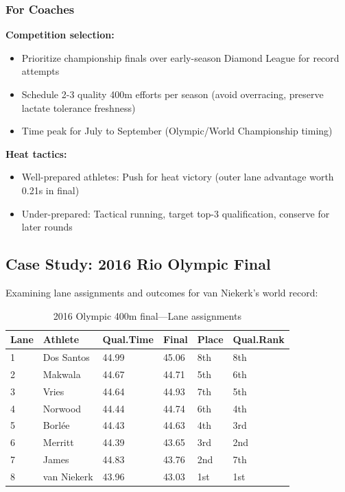 \subsubsection{For Coaches}

\textbf{Competition selection:}
\begin{itemize}
    \item Prioritize championship finals over early-season Diamond League for record attempts
    \item Schedule 2-3 quality 400m efforts per season (avoid overracing, preserve lactate tolerance freshness)
    \item Time peak for July to September (Olympic/World Championship timing)
\end{itemize}

\textbf{Heat tactics:}
\begin{itemize}
    \item Well-prepared athletes: Push for heat victory (outer lane advantage worth 0.21s in final)
    \item Under-prepared: Tactical running, target top-3 qualification, conserve for later rounds
\end{itemize}

\subsection{Case Study: 2016 Rio Olympic Final}

Examining lane assignments and outcomes for van Niekerk's world record:

\begin{table}[H]
\centering
\caption{2016 Olympic 400m final—Lane assignments}
\small
\begin{tabular}{@{}llllll@{}}
\toprule
\textbf{Lane} & \textbf{Athlete} & \textbf{Qual.Time} & \textbf{Final} & \textbf{Place} & \textbf{Qual.Rank} \\
\midrule
1 & Dos Santos & 44.99 & 45.06 & 8th & 8th \\
2 & Makwala & 44.67 & 44.71 & 5th & 6th \\
3 & Vries & 44.64 & 44.93 & 7th & 5th \\
4 & Norwood & 44.44 & 44.74 & 6th & 4th \\
5 & Borlée & 44.43 & 44.63 & 4th & 3rd \\
6 & Merritt & 44.39 & 43.65 & 3rd & 2nd \\
7 & James & 44.83 & 43.76 & 2nd & 7th \\
8 & van Niekerk & 43.96 & 43.03 & 1st & 1st \\
\bottomrule
\end{tabular}
\end{table}

